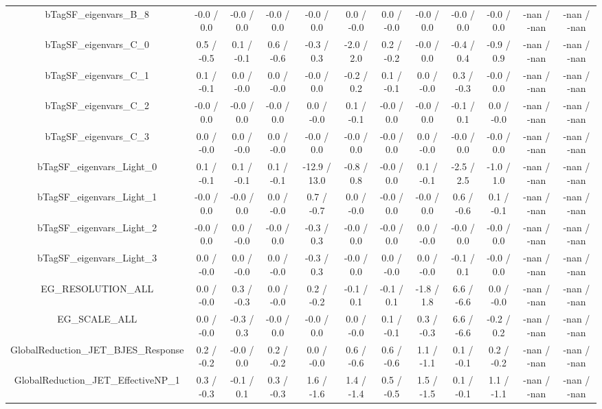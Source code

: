 \begin{table}[htbp]
\begin{center}
\begin{tabular}{|c|c|c|c|c|c|c|c|c|c|c|c|}
  bTagSF_eigenvars_B_8 & -0.0 / 0.0 & -0.0 / 0.0 & -0.0 / 0.0 & -0.0 / 0.0 & 0.0 / -0.0 & 0.0 / -0.0 & -0.0 / 0.0 & -0.0 / 0.0 & -0.0 / 0.0 & -nan / -nan & -nan / -nan \\ 
  bTagSF_eigenvars_C_0 & 0.5 / -0.5 & 0.1 / -0.1 & 0.6 / -0.6 & -0.3 / 0.3 & -2.0 / 2.0 & 0.2 / -0.2 & -0.0 / 0.0 & -0.4 / 0.4 & -0.9 / 0.9 & -nan / -nan & -nan / -nan \\ 
  bTagSF_eigenvars_C_1 & 0.1 / -0.1 & 0.0 / -0.0 & 0.0 / -0.0 & -0.0 / 0.0 & -0.2 / 0.2 & 0.1 / -0.1 & 0.0 / -0.0 & 0.3 / -0.3 & -0.0 / 0.0 & -nan / -nan & -nan / -nan \\ 
  bTagSF_eigenvars_C_2 & -0.0 / 0.0 & -0.0 / 0.0 & -0.0 / 0.0 & 0.0 / -0.0 & 0.1 / -0.1 & -0.0 / 0.0 & -0.0 / 0.0 & -0.1 / 0.1 & 0.0 / -0.0 & -nan / -nan & -nan / -nan \\ 
  bTagSF_eigenvars_C_3 & 0.0 / -0.0 & 0.0 / -0.0 & 0.0 / -0.0 & -0.0 / 0.0 & -0.0 / 0.0 & -0.0 / 0.0 & 0.0 / -0.0 & -0.0 / 0.0 & -0.0 / 0.0 & -nan / -nan & -nan / -nan \\ 
  bTagSF_eigenvars_Light_0 & 0.1 / -0.1 & 0.1 / -0.1 & 0.1 / -0.1 & -12.9 / 13.0 & -0.8 / 0.8 & -0.0 / 0.0 & 0.1 / -0.1 & -2.5 / 2.5 & -1.0 / 1.0 & -nan / -nan & -nan / -nan \\ 
  bTagSF_eigenvars_Light_1 & -0.0 / 0.0 & -0.0 / 0.0 & 0.0 / -0.0 & 0.7 / -0.7 & 0.0 / -0.0 & -0.0 / 0.0 & -0.0 / 0.0 & 0.6 / -0.6 & 0.1 / -0.1 & -nan / -nan & -nan / -nan \\ 
  bTagSF_eigenvars_Light_2 & -0.0 / 0.0 & 0.0 / -0.0 & -0.0 / 0.0 & -0.3 / 0.3 & -0.0 / 0.0 & -0.0 / 0.0 & 0.0 / -0.0 & -0.0 / 0.0 & -0.0 / 0.0 & -nan / -nan & -nan / -nan \\ 
  bTagSF_eigenvars_Light_3 & 0.0 / -0.0 & 0.0 / -0.0 & 0.0 / -0.0 & -0.3 / 0.3 & -0.0 / 0.0 & 0.0 / -0.0 & 0.0 / -0.0 & -0.1 / 0.1 & -0.0 / 0.0 & -nan / -nan & -nan / -nan \\ 
  EG_RESOLUTION_ALL & 0.0 / -0.0 & 0.3 / -0.3 & 0.0 / -0.0 & 0.2 / -0.2 & -0.1 / 0.1 & -0.1 / 0.1 & -1.8 / 1.8 & 6.6 / -6.6 & 0.0 / -0.0 & -nan / -nan & -nan / -nan \\ 
  EG_SCALE_ALL & 0.0 / -0.0 & -0.3 / 0.3 & -0.0 / 0.0 & -0.0 / 0.0 & 0.0 / -0.0 & 0.1 / -0.1 & 0.3 / -0.3 & 6.6 / -6.6 & -0.2 / 0.2 & -nan / -nan & -nan / -nan \\ 
  GlobalReduction_JET_BJES_Response & 0.2 / -0.2 & -0.0 / 0.0 & 0.2 / -0.2 & 0.0 / -0.0 & 0.6 / -0.6 & 0.6 / -0.6 & 1.1 / -1.1 & 0.1 / -0.1 & 0.2 / -0.2 & -nan / -nan & -nan / -nan \\ 
  GlobalReduction_JET_EffectiveNP_1 & 0.3 / -0.3 & -0.1 / 0.1 & 0.3 / -0.3 & 1.6 / -1.6 & 1.4 / -1.4 & 0.5 / -0.5 & 1.5 / -1.5 & 0.1 / -0.1 & 1.1 / -1.1 & -nan / -nan & -nan / -nan \\ 

\end{tabular}
\end{center}
\end{table}
